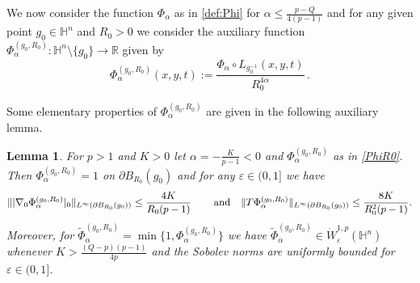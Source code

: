 \documentclass[10pt]{amsart}
\numberwithin{equation}{section}
\newtheorem{lemma}[theorem]{Lemma}
\theoremstyle{definition}
\newcommand{\R}{{\mathbb R}}
\newcommand{\He}{\mathbb{H}}
\begin{document}
We now consider the function $\Phi_{\alpha}$ as in \eqref{def:Phi} for $\alpha \leq \tfrac{p-Q}{4(p-1)}$
and for any given point $g_0 \in \mathbb{H}^n$ and $R_0>0$ we consider the auxiliary function $\Phi^{(g_0, R_0)}_{\alpha} : \He^n \setminus \{ g_0\} \to \R$ given by 
\begin{equation}\label{PhiR0}
\Phi^{(g_0, R_0)}_{\alpha}(x,y,t):= \dfrac{\Phi_{\alpha} \circ L_{g_0^{-1}}(x,y,t)}{R_{0}^{4\alpha}} \, .
\end{equation}

Some elementary properties of $\Phi^{(g_0, R_0)}_{\alpha}$ are given in the following auxiliary lemma.
\begin{lemma}
\label{propertiesPhialpha}
For $p>1$ and $K>0$ let $\alpha=-\frac{K}{p-1}<0$ and $\Phi^{(g_0, R_0)}_{\alpha}$ as in \eqref{PhiR0}. Then $\Phi^{(g_0, R_0)}_{\alpha} = 1$ on $\partial B_{R_0}(g_0)$ and for any $\varepsilon \in (0,1]$ we have
\begin{equation}
\label{normderPhir0}
\| |\nabla_0  \Phi^{(g_0, R_0)}_{\alpha}|_0  \|_{L^\infty (\partial B_{R_0}(g_0))} \leq \frac{4 K}{R_0(p-1)} \, \qquad \hbox{and} \quad \| T  \Phi^{(g_0, R_0)}_{\alpha}  \|_{L^\infty (\partial B_{R_0}(g_0))} \leq \frac{8 K }{R_0^2(p-1)} .
\end{equation}
Moreover, for $\tilde{\Phi}^{(g_0, R_0)}_{\alpha} = \min \{1 ,\Phi^{(g_0, R_0)}_{\alpha}\}$ we have
$ \tilde{\Phi}^{(g_0, R_0)}_{\alpha} \in \dot{W}_\varepsilon^{1,p}(\He^n) $ whenever $K>  \frac{(Q-p)(p-1)}{4p}$ and the Sobolev norms are uniformly bounded for $\varepsilon \in (0, 1]$.
\end{lemma}  
\end{document}
